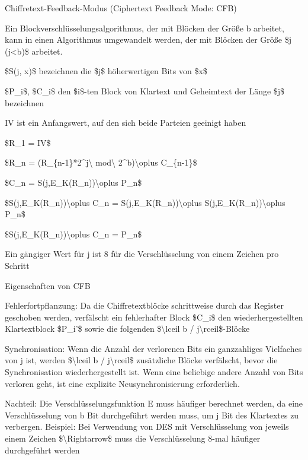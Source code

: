 \documentclass[a4paper]{article}
\begin{document}
\begin{multicols}{3}
      Chiffretext-Feedback-Modus (Ciphertext Feedback Mode: CFB)

      \begin{itemize*}
            \item Ein Blockverschlüsselungsalgorithmus, der mit Blöcken der Größe b
            arbeitet, kann in einen Algorithmus umgewandelt werden, der mit
            Blöcken der Größe \$j (j\textless b)\$ arbeitet.
            \begin{itemize*}
                  \item \$S(j, x)\$ bezeichnen die \$j\$ höherwertigen Bits von \$x\$
                  \item \$P\_i\$, \$C\_i\$ den \$i\$-ten Block von Klartext und Geheimtext der Länge \$j\$ bezeichnen
                  \item IV ist ein Anfangswert, auf den sich beide Parteien geeinigt haben
                  \item \$R\_1 = IV\$
                  \item \$R\_n = (R\_\{n-1\}*2\^{}j\textbackslash{} mod\textbackslash{} 2\^{}b)\textbackslash oplus C\_\{n-1\}\$
                  \item \$C\_n = S(j,E\_K(R\_n))\textbackslash oplus P\_n\$
                  \item \$S(j,E\_K(R\_n))\textbackslash oplus C\_n = S(j,E\_K(R\_n))\textbackslash oplus S(j,E\_K(R\_n))\textbackslash oplus P\_n\$
                  \item \$S(j,E\_K(R\_n))\textbackslash oplus C\_n = P\_n\$
            \end{itemize*}
            \item Ein gängiger Wert für j ist 8 für die Verschlüsselung von einem
            Zeichen pro Schritt
            \item Eigenschaften von CFB
            \begin{itemize*}
                  \item Fehlerfortpflanzung: Da die Chiffretextblöcke schrittweise durch das Register geschoben werden, verfälscht ein fehlerhafter Block \$C\_i\$ den wiederhergestellten Klartextblock \$P\_i'\$ sowie die folgenden \$\textbackslash lceil b / j\textbackslash rceil\$-Blöcke
                  \item Synchronisation: Wenn die Anzahl der verlorenen Bits ein ganzzahliges Vielfaches von j ist, werden \$\textbackslash lceil b / j\textbackslash rceil\$ zusätzliche Blöcke verfälscht, bevor die Synchronisation wiederhergestellt ist. Wenn eine beliebige andere Anzahl von Bits verloren geht, ist eine explizite Neusynchronisierung erforderlich.
                  \item Nachteil: Die Verschlüsselungsfunktion E muss häufiger berechnet werden, da eine Verschlüsselung von b Bit durchgeführt werden muss, um j Bit des Klartextes zu verbergen. Beispiel: Bei Verwendung von DES mit Verschlüsselung von jeweils einem Zeichen \$\textbackslash Rightarrow\$ muss die Verschlüsselung 8-mal häufiger durchgeführt werden
            \end{itemize*}
      \end{itemize*}


\end{multicols}
\end{document}

